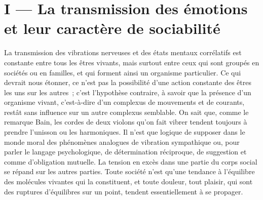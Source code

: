 \documentclass[french,twoside]{book} %
\begin{document}
\section[{I — La transmission des émotions et leur caractère de sociabilité}]{I — La transmission des émotions et leur caractère de sociabilité}
\noindent La transmission des vibrations nerveuses et des états mentaux corrélatifs est constante entre tous les êtres vivants, mais surtout entre ceux qui sont groupés en sociétés ou en familles, et qui forment ainsi un organisme particulier. Ce qui devrait nous étonner, ce n’est pas la possibilité d’une action constante des êtres les uns sur les autres ; c’est l’hypothèse contraire, à savoir que la présence d’un organisme vivant, c’est-à-dire d’un complexus de mouvements et de courants, restât sans influence sur un autre complexus semblable. On sait que, comme le remarque Bain, les cordes de deux violons qu’on fait vibrer tendent toujours à prendre l’unisson ou les harmoniques. Il n’est que logique de supposer dans le monde moral des phénomènes analogues de vibration sympathique ou, pour parler le langage psychologique, de détermination réciproque, de suggestion et comme d’obligation mutuelle. La tension en excès dans une partie du corps social se répand sur les autres parties. Toute société n’est qu’une tendance à l’équilibre des molécules vivantes qui la constituent, et toute douleur, tout plaisir, qui sont des ruptures d’équilibres sur un point, tendent essentiellement à se propager.\par
\end{document}
